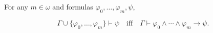For any $m \in \omega$ and formulas $\varphi_0, \dots, \varphi_m, \psi$,

$$\Gamma \cup \{\varphi_0, \dots, \varphi_m\} \vdash \psi \quad \text{iff} \quad \Gamma \vdash \varphi_0 \wedge \cdots \wedge \varphi_m \rightarrow \psi.$$
